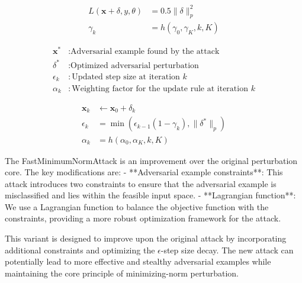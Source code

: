 \begin{align*}
L(\mathbf{x} + \delta, y, \theta) &= 0.5 \|\delta\|_p^2 \\
\gamma_k &= h(\gamma_0, \gamma_K, k, K)
\end{align*}

\begin{align*}
\mathbf{x}^* &: \text{Adversarial example found by the attack} \\
\delta^* &: \text{Optimized adversarial perturbation} \\
\epsilon_k &: \text{Updated step size at iteration } k \\
\alpha_k &: \text{Weighting factor for the update rule at iteration } k
\end{align*}

\begin{align*}
\mathbf{x}_k &\gets \mathbf{x}_0 + \delta_k \\
\epsilon_k &= \min(\epsilon_{k-1}(1 - \gamma_k), \|\delta^*\|_p)\\
\alpha_k &= h(\alpha_0, \alpha_K, k, K)
\end{align*}

The FastMinimumNormAttack is an improvement over the original perturbation core. The key modifications are:
- **Adversarial example constraints**: This attack introduces two constraints to ensure that the adversarial example is misclassified and lies within the feasible input space.
- **Lagrangian function**: We use a Lagrangian function to balance the objective function with the constraints, providing a more robust optimization framework for the attack.

This variant is designed to improve upon the original attack by incorporating additional constraints and optimizing the $\epsilon$-step size decay. The new attack can potentially lead to more effective and stealthy adversarial examples while maintaining the core principle of minimizing-norm perturbation.
